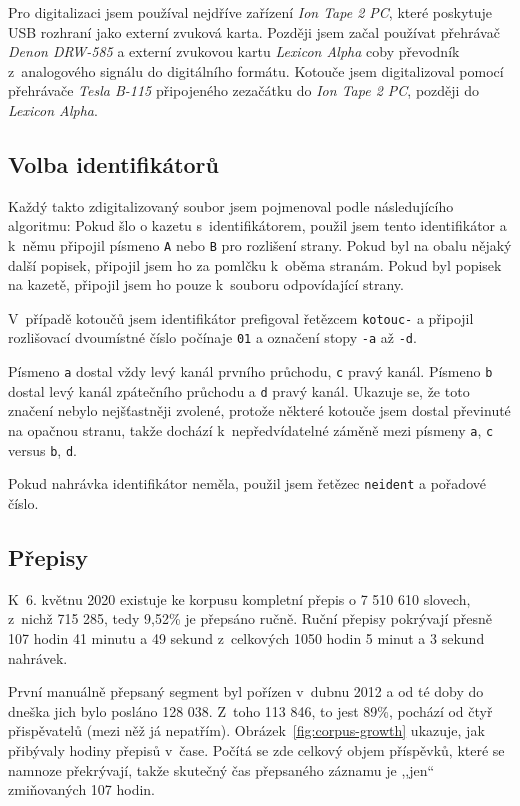 Pro digitalizaci jsem používal nejdříve zařízení {\em Ion Tape 2 PC}, které
poskytuje USB rozhraní jako externí zvuková karta. Později jsem začal používat
přehrávač {\em Denon DRW-585} a externí zvukovou kartu {\em Lexicon Alpha} coby převodník
z~analogového signálu do digitálního formátu. Kotouče jsem digitalizoval pomocí
přehrávače {\em Tesla B-115} připojeného zezačátku do {\em Ion Tape 2 PC},
později do {\em Lexicon Alpha}.

\subsection{Volba identifikátorů}

Každý takto zdigitalizovaný soubor jsem pojmenoval podle následujícího
algoritmu: Pokud šlo o kazetu s~identifikátorem, použil jsem tento identifikátor
a k~němu připojil písmeno \texttt{A} nebo \texttt{B} pro rozlišení strany. Pokud
byl na obalu nějaký další popisek, připojil jsem ho za pomlčku k~oběma stranám.
Pokud byl popisek na kazetě, připojil jsem ho pouze k~souboru odpovídající strany.

V~případě
kotoučů jsem identifikátor prefigoval řetězcem \texttt{kotouc-} a připojil
rozlišovací dvoumístné číslo počínaje \texttt{01} a označení stopy \texttt{-a}
až \texttt{-d}.

Písmeno \texttt{a} dostal vždy levý kanál prvního průchodu, \texttt{c} pravý
kanál. Písmeno \texttt{b} dostal levý kanál zpátečního průchodu a \texttt{d}
pravý kanál. Ukazuje se, že toto značení nebylo nejšťastněji zvolené, protože
některé kotouče jsem dostal převinuté na opačnou stranu, takže dochází
k~nepředvídatelné záměně mezi písmeny \texttt{a}, \texttt{c} versus \texttt{b},
\texttt{d}.

Pokud nahrávka identifikátor neměla, použil jsem řetězec \texttt{neident} a
pořadové číslo.

\subsection{Přepisy}

K~6. květnu 2020 existuje ke korpusu kompletní přepis o 7 510 610
slovech, z~nichž 715 285, tedy 9,52\% je přepsáno ručně.
Ruční přepisy pokrývají přesně 107 hodin 41 minutu a 49 sekund z~celkových
1050 hodin 5 minut a 3 sekund nahrávek.

První manuálně přepsaný segment byl pořízen v~dubnu 2012 a od té doby do dneška
jich bylo posláno 128 038. Z~toho 113 846, to jest 89\%, pochází od čtyř
přispěvatelů (mezi něž já nepatřím).
Obrázek~\ref{fig:corpus-growth} ukazuje, jak přibývaly hodiny přepisů v~čase.
Počítá se zde celkový objem příspěvků, které se namnoze překrývají, takže
skutečný čas přepsaného záznamu je ,,jen`` zmiňovaných 107 hodin.


